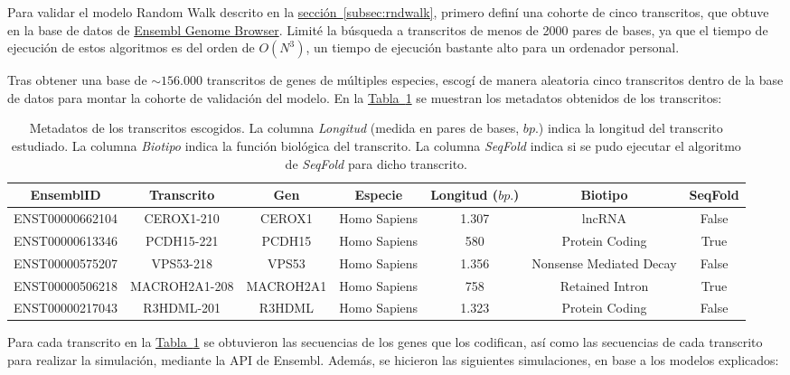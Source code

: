 \documentclass[a4paper,11pt,titlepage]{article}
\newcommand{\nr}[2][sección]{\hyperref[#2]{#1~\ref{#2}}}
\theoremstyle{definition}
\begin{document}
Para validar el modelo Random Walk descrito en la \nr[sección]{subsec:rndwalk}, primero definí una cohorte de cinco transcritos, que obtuve en la base de datos de \href{https://www.ensembl.org/index.html}{Ensembl Genome Browser}. Limité la búsqueda a transcritos de menos de 2000 pares de bases, ya que el tiempo de ejecución de estos algoritmos es del orden de $O(N^3)$, un tiempo de ejecución bastante alto para un ordenador personal.

Tras obtener una base de $\sim156.000$ transcritos de genes de múltiples especies, escogí de manera aleatoria cinco transcritos dentro de la base de datos para montar la cohorte de validación del modelo. En la \nr[Tabla]{tab:transcripts} se muestran los metadatos obtenidos de los transcritos:

\begin{table}[H]
	\centering
    \begin{adjustbox}{width=\textwidth}
	\begin{tabular}{ccccccc}
	    \toprule
        EnsemblID & Transcrito & Gen & Especie & Longitud ($bp.$) & Biotipo & SeqFold \\
		\midrule
        ENST00000662104 & CEROX1-210 & CEROX1 & Homo Sapiens & 1.307 & lncRNA & False \\
        ENST00000613346 & PCDH15-221 & PCDH15 & Homo Sapiens & 580 & Protein Coding  & True \\
        ENST00000575207 & VPS53-218 & VPS53 & Homo Sapiens & 1.356 & Nonsense Mediated Decay & False \\
        ENST00000506218 & MACROH2A1-208 & MACROH2A1 & Homo Sapiens & 758 & Retained Intron & True \\
        ENST00000217043 & R3HDML-201 & R3HDML & Homo Sapiens & 1.323 & Protein Coding & False \\
		\bottomrule
	\end{tabular}
    \end{adjustbox}
	\small{\caption{Metadatos de los transcritos escogidos. La columna \textit{Longitud} (medida en pares de bases, $bp.$) indica la longitud del transcrito estudiado. La columna \textit{Biotipo} indica la función biológica del transcrito. La columna \textit{SeqFold} indica si se pudo ejecutar el algoritmo de \textit{SeqFold} para dicho transcrito.}\label{tab:transcripts}}\normalsize
\end{table}

Para cada transcrito en la \nr[Tabla]{tab:transcripts} se obtuvieron las secuencias de los genes que los codifican, así como las secuencias de cada transcrito para realizar la simulación, mediante la API de Ensembl. Además, se hicieron las siguientes simulaciones, en base a los modelos explicados: 
\end{document}
